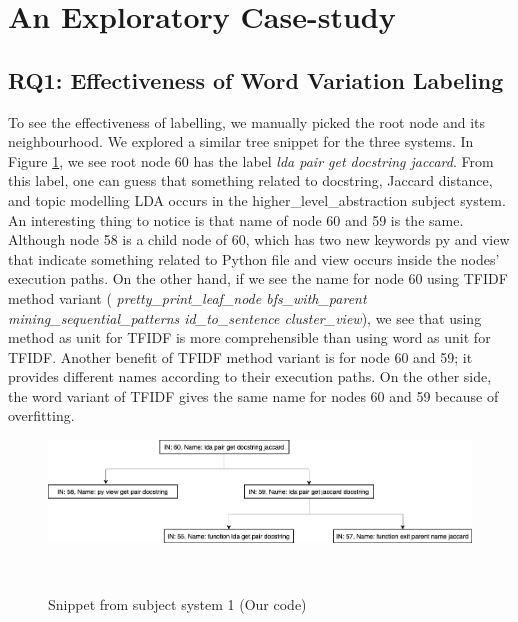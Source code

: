 \section{An Exploratory Case-study}

\subsection{ RQ1: Effectiveness of Word Variation Labeling}
To see the effectiveness of labelling, we manually picked the root node and its neighbourhood. We explored a similar tree snippet for the three systems. In Figure \ref{fig:rq1_hla1}, we see root node 60 has the label \textit{lda pair get docstring jaccard}. From this label, one can guess that something related to docstring, Jaccard distance, and topic modelling LDA occurs in the higher\_level\_abstraction subject system. An interesting thing to notice is that name of node 60 and 59 is the same. Although node 58 is a child node of 60, which has two new keywords py and view that indicate something related to Python file and view occurs inside the nodes' execution paths. On the other hand, if we see the name for node 60 using TFIDF method variant ( \textit{pretty\_print\_leaf\_node bfs\_with\_parent mining\_sequential\_patterns id\_to\_sentence cluster\_view}), we see that using method as unit for TFIDF is more comprehensible than using word as unit for TFIDF. Another benefit of TFIDF method variant is for node 60 and 59; it provides different names according to their execution paths. On the other side, the word variant of TFIDF gives the same name for nodes 60 and 59 because of over\-fitting.
\begin{figure}[h]
  \centering
  \includegraphics[width=1\columnwidth]{figures/hla2/rq1_hla1.png}
  \caption{Snippet from subject system 1 (Our code)}~\label{fig:rq1_hla1}
\end{figure}


